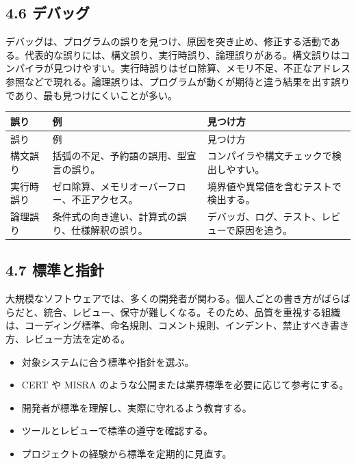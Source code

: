 \documentclass[a4paper,11pt]{ltjsarticle}
\begin{document}
\subsection{4.6 デバッグ}

デバッグは、プログラムの誤りを見つけ、原因を突き止め、修正する活動である。代表的な誤りには、構文誤り、実行時誤り、論理誤りがある。構文誤りはコンパイラが見つけやすい。実行時誤りはゼロ除算、メモリ不足、不正なアドレス参照などで現れる。論理誤りは、プログラムが動くが期待と違う結果を出す誤りであり、最も見つけにくいことが多い。

\begin{longtable}{>{\raggedright\arraybackslash}p{}>{\raggedright\arraybackslash}p{}>{\raggedright\arraybackslash}p{}}
\toprule
誤り & 例 & 見つけ方 \\
\midrule
\endfirsthead
\toprule
誤り & 例 & 見つけ方 \\
\midrule
\endhead
構文誤り & 括弧の不足、予約語の誤用、型宣言の誤り。 & コンパイラや構文チェックで検出しやすい。 \\
実行時誤り & ゼロ除算、メモリオーバーフロー、不正アクセス。 & 境界値や異常値を含むテストで検出する。 \\
論理誤り & 条件式の向き違い、計算式の誤り、仕様解釈の誤り。 & デバッガ、ログ、テスト、レビューで原因を追う。 \\
\bottomrule
\end{longtable}

\subsection{4.7 標準と指針}

大規模なソフトウェアでは、多くの開発者が関わる。個人ごとの書き方がばらばらだと、統合、レビュー、保守が難しくなる。そのため、品質を重視する組織は、コーディング標準、命名規則、コメント規則、インデント、禁止すべき書き方、レビュー方法を定める。

\begin{itemize}[leftmargin=2em]
\item 対象システムに合う標準や指針を選ぶ。
\item CERT や MISRA のような公開または業界標準を必要に応じて参考にする。
\item 開発者が標準を理解し、実際に守れるよう教育する。
\item ツールとレビューで標準の遵守を確認する。
\item プロジェクトの経験から標準を定期的に見直す。
\end{itemize}
\end{document}
